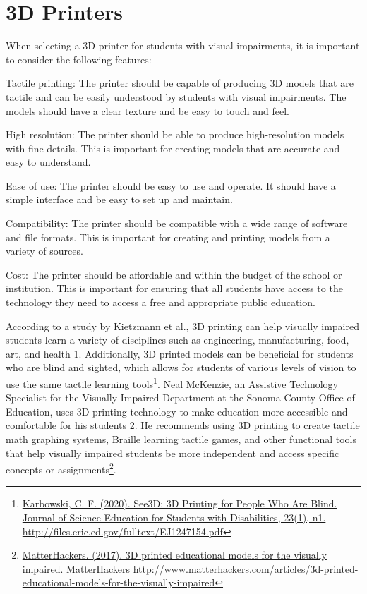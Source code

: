 \documentclass[12pt,letterpaper,twoside]{extreport}
\begin{document}
\pagebreak \hypertarget{d-print-equipment}{}	\section{3D Printers}\label{d-print-equipment}
When selecting a 3D printer for students with visual impairments, it is important to consider the following features:

Tactile printing: The printer should be capable of producing 3D models that are tactile and can be easily understood by students with visual impairments. The models should have a clear texture and be easy to touch and feel.

High resolution: The printer should be able to produce high-resolution models with fine details. This is important for creating models that are accurate and easy to understand.

Ease of use: The printer should be easy to use and operate. It should have a simple interface and be easy to set up and maintain.

Compatibility: The printer should be compatible with a wide range of software and file formats. This is important for creating and printing models from a variety of sources.

Cost: The printer should be affordable and within the budget of the school or institution. This is important for ensuring that all students have access to the technology they need to access a free and appropriate public education.

According to a study by Kietzmann et al., 3D printing can help visually impaired students learn a variety of disciplines such as engineering, manufacturing, food, art, and health 1. Additionally, 3D printed models can be beneficial for students who are blind and sighted, which allows for students of various levels of vision to use the same tactile learning tools\footnote{\raggedright \href{http://files.eric.ed.gov/fulltext/EJ1247154.pdf}{Karbowski, C. F. (2020). See3D: 3D Printing for People Who Are Blind. Journal of Science Education for Students with Disabilities, 23(1), n1.} \url{http://files.eric.ed.gov/fulltext/EJ1247154.pdf}}. Neal McKenzie, an Assistive Technology Specialist for the Visually Impaired Department at the Sonoma County Office of Education, uses 3D printing technology to make education more accessible and comfortable for his students 2. He recommends using 3D printing to create tactile math graphing systems, Braille learning tactile games, and other functional tools that help visually impaired students be more independent and access specific concepts or assignments\footnote{\raggedright \raggedright\href{http://www.matterhackers.com/articles/3d-printed-educational-models-for-the-visually-impaired}{MatterHackers. (2017). 3D printed educational models for the visually impaired. MatterHackers} \hfill\break\url{http://www.matterhackers.com/articles/3d-printed-educational-models-for-the-visually-impaired}}. 
\end{document}
